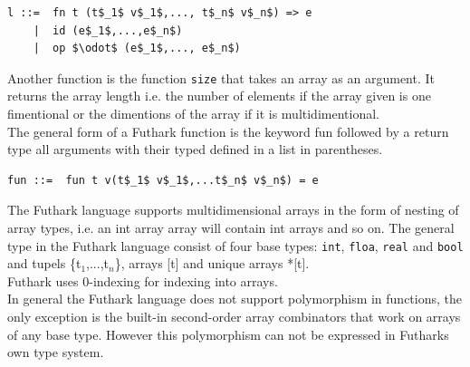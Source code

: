 \documentclass[11pt]{article}
\begin{document}
\begin{lstlisting}[numbers=none,frame=none]
l ::=  fn t (t$_1$ v$_1$,..., t$_n$ v$_n$) => e
    |  id (e$_1$,...,e$_n$)
    |  op $\odot$ (e$_1$,..., e$_n$)
\end{lstlisting}


Another function is the function {\tt size} that takes an array as an argument. It returns the array length i.e. the number of elements if the array given is one fimentional or the dimentions of the array if it is multidimentional. \\

The general form of a Futhark function is the keyword fun followed by a return type all arguments 
with their typed defined in a list in parentheses.
\begin{lstlisting}[numbers=none,frame=none]
fun ::=  fun t v(t$_1$ v$_1$,...t$_n$ v$_n$) = e
\end{lstlisting}


The Futhark language supports multidimensional arrays in the form of nesting of array types,
i.e. an int array array will contain int arrays and so on.
The general type in the Futhark language consist of four base types: {\tt int}, {\tt floa}, {\tt real} and {\tt bool} and tupels \{t$_1$,...,t$_n$\}, arrays [t] and unique arrays *[t].\\

Futhark uses 0-indexing for indexing into arrays.\\ %

In general the Futhark language does not support polymorphism in functions,
the only exception is the built-in second-order array combinators that work on arrays of any base type. 
However this polymorphism can not be expressed in Futharks own type system. 







{}

\end{document}
